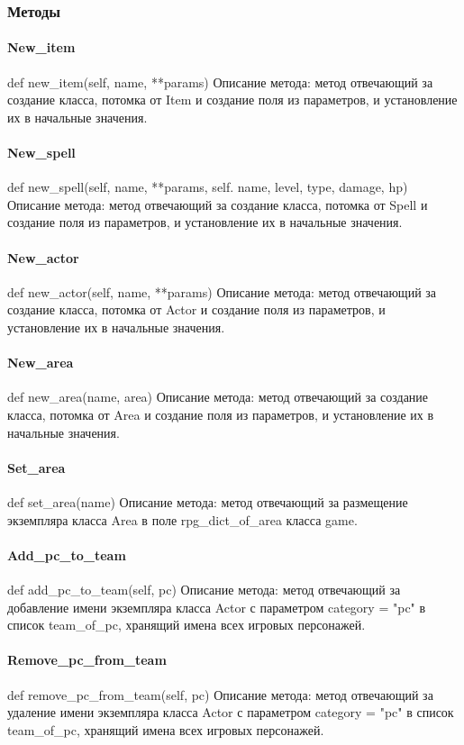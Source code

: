 \subsubsection{Методы}
\paragraph{New\_item}
def new\_item(self, name, **params)
Описание метода: метод отвечающий за создание класса, потомка от Item и создание поля из параметров, и установление их в начальные значения.
\paragraph{New\_spell}
def new\_spell(self, name, **params, self. name, level, type, damage, hp)
Описание метода: метод отвечающий за создание класса, потомка от Spell и создание поля из параметров, и установление их в начальные значения.
\paragraph{New\_actor}
def new\_actor(self, name, **params)
Описание метода: метод отвечающий за создание класса, потомка от Actor и создание поля из параметров, и установление их в начальные значения.
\paragraph{New\_area}
def new\_area(name, area)
Описание метода: метод отвечающий за создание класса, потомка от Area и создание поля из параметров, и установление их в начальные значения.
\paragraph{Set\_area}
def set\_area(name)
Описание метода: метод отвечающий за размещение экземпляра класса Area в поле rpg\_dict\_of\_area класса game.
\paragraph{Add\_pc\_to\_team}
def add\_pc\_to\_team(self, pc)
Описание метода: метод отвечающий за добавление имени экземпляра класса Actor с параметром category = "pc" в список team\_of\_pc, хранящий имена всех игровых персонажей.
\paragraph{Remove\_pc\_from\_team}
def remove\_pc\_from\_team(self, pc)
Описание метода: метод отвечающий за удаление имени экземпляра класса Actor с параметром category = "pc" в список team\_of\_pc, хранящий имена всех игровых персонажей.
